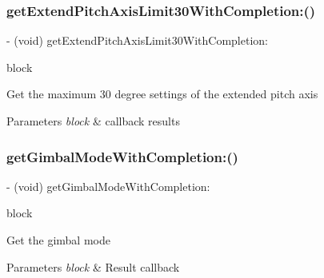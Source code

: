 \subsubsection{\texorpdfstring{get\+Extend\+Pitch\+Axis\+Limit30\+With\+Completion\+:()}{getExtendPitchAxisLimit30WithCompletion:()}}
{\footnotesize\ttfamily -\/ (void) get\+Extend\+Pitch\+Axis\+Limit30\+With\+Completion\+: \begin{DoxyParamCaption}\item[{(void($^\wedge$)(B\+O\+OL is\+Extend, N\+S\+Error $\ast$\hyperlink{group___p_v_s_d_k___c_o_r_e___a_p_i___m_o_u_n_t_c_o_n_t_r_o_l_ga5a1de33b230662127568783314b4a54d}{\+\_\+\+Nullable} error))}]{block }\end{DoxyParamCaption}}

Get the maximum 30 degree settings of the extended pitch axis


\begin{DoxyParams}{Parameters}
{\em block} & callback results \\
\hline
\end{DoxyParams}
\mbox{\label{interface_p_v_gimabal_a05eb12c923045267506ab6afc2f97275}} 
\subsubsection{\texorpdfstring{get\+Gimbal\+Mode\+With\+Completion\+:()}{getGimbalModeWithCompletion:()}}
{\footnotesize\ttfamily -\/ (void) get\+Gimbal\+Mode\+With\+Completion\+: \begin{DoxyParamCaption}\item[{(void($^\wedge$)(P\+V\+Gimbal\+Mode gimbal\+Mode, N\+S\+Error $\ast$\hyperlink{group___p_v_s_d_k___c_o_r_e___a_p_i___m_o_u_n_t_c_o_n_t_r_o_l_ga5a1de33b230662127568783314b4a54d}{\+\_\+\+Nullable} error))}]{block }\end{DoxyParamCaption}}

Get the gimbal mode


\begin{DoxyParams}{Parameters}
{\em block} & Result callback \\
\hline
\end{DoxyParams}
\mbox{\label{interface_p_v_gimabal_a3784401e0533479bf5abd8fa52c5900e}} 

